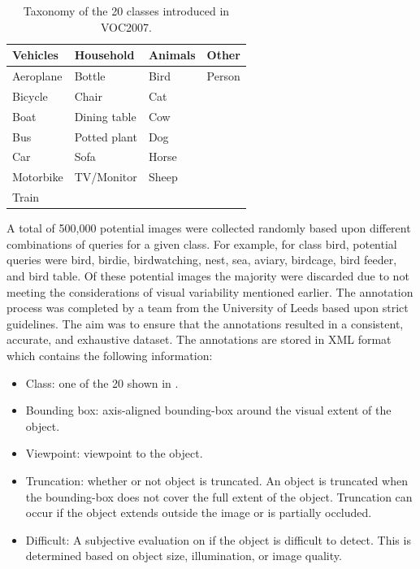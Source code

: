 \begin{table}[h]
\centering
\caption{Taxonomy of the 20 classes introduced in VOC2007.}
\label{tab:vocclasses}
\begin{tabular}{llll}
\hline
Vehicles & Household & Animals & Other \\ \hline
Aeroplane                      & Bottle                         & Bird                         & Person                     \\
Bicycle                        & Chair                          & Cat                          &                            \\
Boat                           & Dining table                   & Cow                          &                            \\
Bus                            & Potted plant                   & Dog                          &                            \\
Car                            & Sofa                           & Horse                        &                            \\
Motorbike                      & TV/Monitor                     & Sheep                        &                            \\ \hline
Train    &  &  &  \\ \hline
\end{tabular}
\end{table}

A total of 500,000 potential images were collected randomly based upon different combinations of queries for a given class. For example, for class bird, potential queries were bird, birdie, birdwatching, nest, sea, aviary, birdcage, bird feeder, and bird table. Of these potential images the majority were discarded due to not meeting the considerations of visual variability mentioned earlier. The annotation process was completed by a team from the University of Leeds based upon strict guidelines. The aim was to ensure that the annotations resulted in a consistent, accurate, and exhaustive dataset. The annotations are stored in XML format which contains the following information:

\begin{itemize}
	\item Class: one of the 20 shown in .
	\item Bounding box: axis-aligned bounding-box around the visual extent of the object.
	\item Viewpoint: viewpoint to the object.
	\item Truncation: whether or not object is truncated. An object is truncated when the bounding-box does not cover the full extent of the object. Truncation can occur if the object extends outside the image or is partially occluded.
	\item Difficult: A subjective evaluation on if the object is difficult to detect. This is determined based on object size, illumination, or image quality.
\end{itemize}

